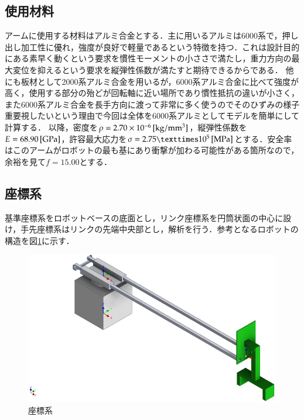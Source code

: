 \documentclass[10pt,b5paper,papersize,dvipdfmx]{jsbook}
\begin{document}
\subsection{使用材料}
アームに使用する材料はアルミ合金とする．主に用いるアルミは6000系で，押し出し加工性に優れ，強度が良好で軽量であるという特徴を持つ．これは設計目的にある素早く動くという要求を慣性モーメントの小ささで満たし，重力方向の最大変位を抑えるという要求を縦弾性係数が満たすと期待できるからである．
他にも板材として2000系アルミ合金を用いるが，6000系アルミ合金に比べて強度が高く，使用する部分の殆どが回転軸に近い場所であり慣性抵抗の違いが小さく，また6000系アルミ合金を長手方向に渡って非常に多く使うのでそのひずみの様子重要視したいという理由で今回は全体を6000系アルミとしてモデルを簡単にして計算する．
以降，密度を$\rho=2.70\times 10^{-6}\tani*{kg/mm^3}$，縦弾性係数を$E=68.90 \tani*{GPa}$，許容最大応力を$\sigma=2.75×10^{5} \tani*{MPa}$とする．安全率はこのアームがロボットの最も基にあり衝撃が加わる可能性がある箇所なので，余裕を見て$f=15.00$とする．

\subsection{座標系}\label{座標系}
基準座標系をロボットベースの底面とし，リンク座標系を円筒状面の中心に設け，手先座標系はリンクの先端中央部とし，解析を行う．参考となるロボットの構造を図\ref{fig:座標系}に示す．
\begin{figure}[htbp]
  \centering
  \includegraphics[width=.85\textwidth]{img/robot01.png}
  \caption{座標系}
  \label{fig:座標系}
\end{figure}
\end{document}
